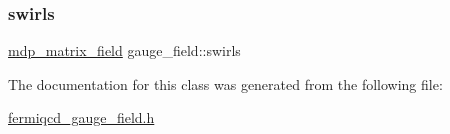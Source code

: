 \subsubsection{\texorpdfstring{swirls}{swirls}}
{\footnotesize\ttfamily \hyperlink{classmdp__matrix__field}{mdp\+\_\+matrix\+\_\+field} gauge\+\_\+field\+::swirls}



The documentation for this class was generated from the following file\+:\begin{DoxyCompactItemize}
\item 
\hyperlink{fermiqcd__gauge__field_8h}{fermiqcd\+\_\+gauge\+\_\+field.\+h}\end{DoxyCompactItemize}
